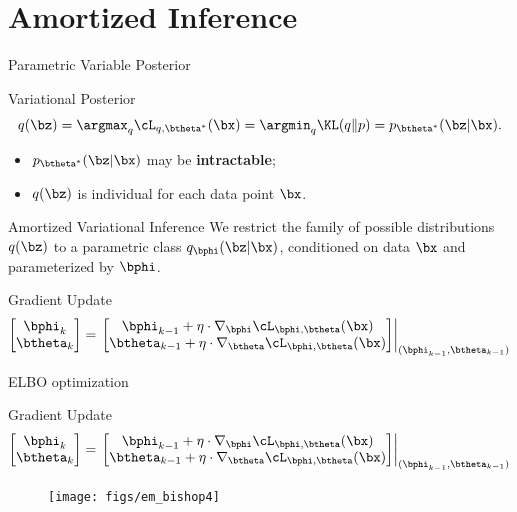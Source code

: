\documentclass{beamer}
\begin{document}
\section{Amortized Inference}
\begin{frame}{Parametric Variable Posterior}
	\begin{block}{Variational Posterior}
		\vspace{-0.3cm}
		\[
			q(\bz) = \argmax_q \cL_{q, \btheta^*}(\bx) = \argmin_q \KL(q \| p) =
		p_{\btheta^*}(\bz| \bx).
		\]
		\eqpause
		\begin{itemize}
			\item {\color{violet}$p_{\btheta^*}(\bz| \bx)$ may be \textbf{intractable}};
			\item {\color{teal}$q(\bz)$ is individual for each data point $\bx$}.
		\end{itemize}
	\end{block}
	\eqpause
	\begin{block}{Amortized Variational Inference}
		We restrict the family of possible distributions $q(\bz)$ to a parametric class $q_{\bphi}(\bz| \bx)$, {\color{teal}conditioned on data $\bx$} and {\color{violet}parameterized by $\bphi$}.
	\end{block}		
	\eqpause
	\begin{block}{Gradient Update}
		\[
			\begin{bmatrix}
				\bphi_k \\
				\btheta_k
			\end{bmatrix}
			= \left.
			\begin{bmatrix}
				\bphi_{k-1} + \eta \cdot \nabla_{\bphi} \cL_{\bphi, \btheta}(\bx) \\
				\btheta_{k-1} + \eta \cdot \nabla_{\btheta} \cL_{\bphi, \btheta}(\bx)
			\end{bmatrix}
			\right|_{(\bphi_{k-1}, \btheta_{k-1})}
		\]
	\end{block}
\end{frame}
\begin{frame}{ELBO optimization}
	\begin{block}{Gradient Update}
		\[
			\begin{bmatrix}
				\bphi_k \\
				\btheta_k
			\end{bmatrix}
			= \left.
			\begin{bmatrix}
				\bphi_{k-1} + \eta \cdot \nabla_{\bphi} \cL_{\bphi, \btheta}(\bx) \\
				\btheta_{k-1} + \eta \cdot \nabla_{\btheta} \cL_{\bphi, \btheta}(\bx)
			\end{bmatrix}
			\right|_{(\bphi_{k-1}, \btheta_{k-1})}
		\]
	\end{block}
	\begin{figure}
		\texttt{[image: figs/em\_bishop4]}
	\end{figure}
		
\end{frame}
\end{document}

